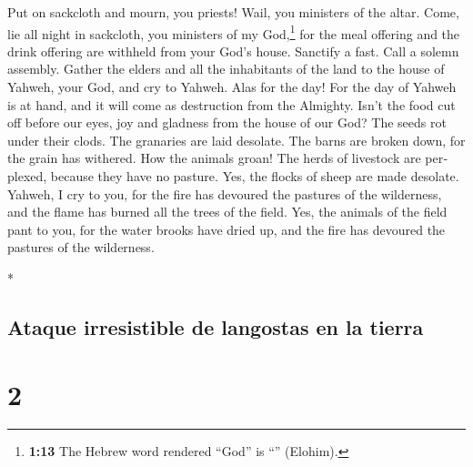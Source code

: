 \begin{paracol}{2}
\begin{otherlanguage}{english}
 Put on sackcloth and mourn, you priests! Wail, you
ministers of the altar. Come, lie all night in sackcloth, you ministers
of my God,\footnote{\textbf{1:13} The Hebrew word rendered ``God'' is
  ``'' (Elohim).} for the meal offering and the drink
offering are withheld from your God's house.  Sanctify a
fast. Call a solemn assembly. Gather the elders and all the inhabitants
of the land to the house of Yahweh, your God, and cry to Yahweh.
 Alas for the day! For the day of Yahweh is at hand, and
it will come as destruction from the Almighty.  Isn't the
food cut off before our eyes, joy and gladness from the house of our
God?  The seeds rot under their clods. The granaries are
laid desolate. The barns are broken down, for the grain has withered.
 How the animals groan! The herds of livestock are
perplexed, because they have no pasture. Yes, the flocks of sheep are
made desolate.  Yahweh, I cry to you, for the fire has
devoured the pastures of the wilderness, and the flame has burned all
the trees of the field.  Yes, the animals of the field
pant to you, for the water brooks have dried up, and the fire has
devoured the pastures of the wilderness.

\end{otherlanguage}

\switchcolumn[0]*

\hypertarget{ataque-irresistible-de-langostas-en-la-tierra}{%
\subsection{Ataque irresistible de langostas en la
tierra}\label{ataque-irresistible-de-langostas-en-la-tierra}}

\hypertarget{section-2}{%
\section{2}\label{section-2}}


\end{paracol}
